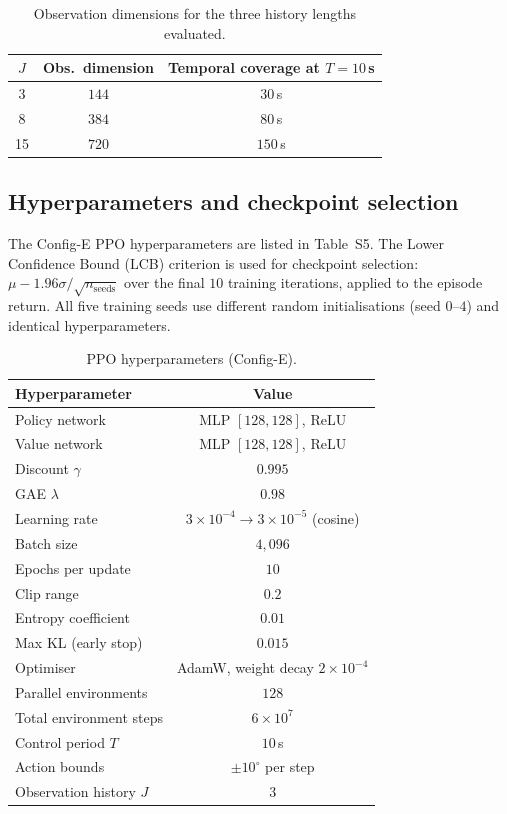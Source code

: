 \documentclass{article}
\begin{document}
\begin{table}[h]
\centering
\caption{Observation dimensions for the three history lengths evaluated.}
\label{tab:obs_dims}
\small
\begin{tabular}{ccc}
\toprule
$J$ & Obs.\ dimension & Temporal coverage at $T{=}10$\,s \\
\midrule
3  & $144$ & $30$\,s \\
8  & $384$ & $80$\,s \\
15 & $720$ & $150$\,s \\
\bottomrule
\end{tabular}
\end{table}

\subsection{Hyperparameters and checkpoint selection}

The Config-E PPO hyperparameters are listed in Table~S5. The Lower Confidence Bound (LCB) criterion is used for checkpoint selection: $\mu - 1.96\sigma/\sqrt{n_\mathrm{seeds}}$ over the final $10$ training iterations, applied to the episode return. All five training seeds use different random initialisations (seed $0$--$4$) and identical hyperparameters.

\begin{table}[h]
\centering
\caption{PPO hyperparameters (Config-E).}
\label{tab:ppo_hp}
\small
\begin{tabular}{lc}
\toprule
Hyperparameter & Value \\
\midrule
Policy network & MLP $[128,128]$, ReLU \\
Value network  & MLP $[128,128]$, ReLU \\
Discount $\gamma$ & $0.995$ \\
GAE $\lambda$ & $0.98$ \\
Learning rate & $3{\times}10^{-4} \rightarrow 3{\times}10^{-5}$ (cosine) \\
Batch size & $4{,}096$ \\
Epochs per update & $10$ \\
Clip range & $0.2$ \\
Entropy coefficient & $0.01$ \\
Max KL (early stop) & $0.015$ \\
Optimiser & AdamW, weight decay $2{\times}10^{-4}$ \\
Parallel environments & $128$ \\
Total environment steps & $6{\times}10^{7}$ \\
Control period $T$ & $10$\,s \\
Action bounds & $\pm10^\circ$ per step \\
Observation history $J$ & $3$ \\
\bottomrule
\end{tabular}
\end{table}
\end{document}

